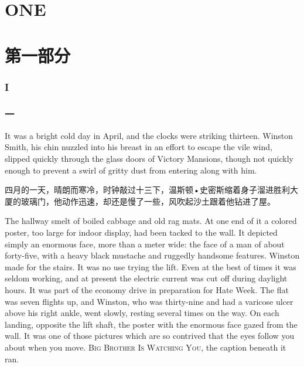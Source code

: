 \begin{paracol}{2}
\clearpage
\part{ONE}\label{one}

\switchcolumn

\part*{第一部分}

\switchcolumn*

\section{I}

\switchcolumn

\section*{一}\label{ux4e00}

\switchcolumn*

It was a bright cold day in April, and the clocks were striking
thirteen. Winston Smith, his chin nuzzled into his breast in an effort
to escape the vile wind, slipped quickly through the glass doors of
Victory Mansions, though not quickly enough to prevent a swirl of gritty
dust from entering along with him.

\switchcolumn

四月的一天，晴朗而寒冷，时钟敲过十三下，温斯顿•史密斯缩着身子溜进胜利大厦的玻璃门，他动作迅速，却还是慢了一些，风吹起沙土跟着他钻进了屋。

\switchcolumn*

The hallway smelt of boiled cabbage and old rag mats. At one end of it a
colored poster, too large for indoor display, had been tacked to the wall.
It depicted simply an enormous face, more than a meter wide: the face of a
man of about forty-five, with a heavy black mustache and ruggedly handsome
features. Winston made for the stairs. It was no use trying the lift. Even
at the best of times it was seldom working, and at present the electric
current was cut off during daylight hours. It was part of the economy drive
in preparation for Hate Week. The flat was seven flights up, and Winston,
who was thirty-nine and had a varicose ulcer above his right ankle, went
slowly, resting several times on the way. On each landing, opposite the lift
shaft, the poster with the enormous face gazed from the wall. It was one of
those pictures which are so contrived that the eyes follow you about when
you move. \textsc{Big Brother Is Watching You}, the caption beneath it ran.


\end{paracol}
